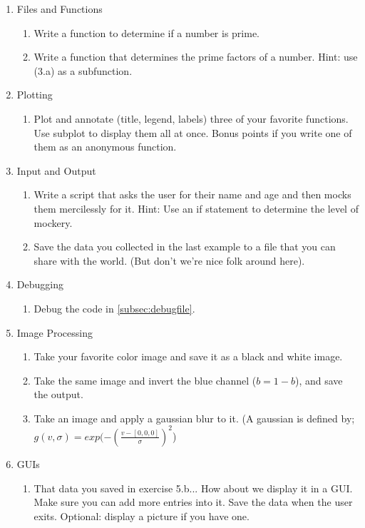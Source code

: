 \begin{enumerate}
 \item Files and Functions
  \begin{enumerate}
   \item Write a function to determine if a number is prime.
   \item Write a function that determines the prime factors of a number. Hint: use (3.a) as a subfunction.
  \end{enumerate}

 \item Plotting
  \begin{enumerate}
   \item Plot and annotate (title, legend, labels) three of your favorite functions. Use subplot to display them all at once. Bonus points if you write one of them as an anonymous function.
  \end{enumerate}

 \item Input and Output
  \begin{enumerate}
   \item Write a script that asks the user for their name and age and then mocks them mercilessly for it. Hint: Use an if statement to determine the level of mockery.
   \item Save the data you collected in the last example to a file that you can share with the world. (But don't we're nice folk around here).
  \end{enumerate}

 \item Debugging
  \begin{enumerate}
   \item Debug the code in \ref{subsec:debugfile}.
  \end{enumerate}

 \item Image Processing
  \begin{enumerate}
   \item Take your favorite color image and save it as a black and white image.
   \item Take the same image and invert the blue channel ($b = 1-b$), and save the output.
   \item Take an image and apply a gaussian blur to it. (A gaussian is defined by; $g(v,\sigma) = exp(-\left( \frac{v-[0,0,0]}{\sigma}\right)^2$)
  \end{enumerate}

 \item GUIs
  \begin{enumerate}
   \item That data you saved in exercise 5.b... How about we display it in a GUI. Make sure you can add more entries into it. Save the data when the user exits. Optional: display a picture if you have one.
  \end{enumerate}


\end{enumerate}
